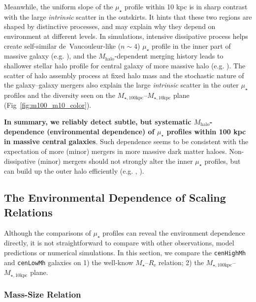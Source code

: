 \documentclass[a4paper,fleqn,usenatbib]{mnras}
\def\rbcg{\texttt{cenHighMh}}
\def\nbcg{\texttt{cenLowMh}}
\def\mstar{{$M_{\star}$}}
\def\mhalo{{$M_{\mathrm{halo}}$}}
\def\minn{{$M_{\star,10\mathrm{kpc}}$}}
\def\mtot{{$M_{\star,100\mathrm{kpc}}$}}
\def\mden{{$\mu_{\star}$}}
\begin{document}
    Meanwhile, the uniform slope of the \mden{} profile within 10 kpc is in sharp 
    contrast with the large \textit{intrinsic} scatter in the outskirts. 
    It hints that these two regions are shaped by distinctive processes, and may 
    explain why they depend on environment at different levels.  
    In simulations, intensive dissipative process helps create 
    self-similar de~Vaucouleur-like ($n{\sim} 4$) \mden{} profile in the inner part 
    of massive galaxy (e.g. \citealt{Hopkins2008}), and the \mhalo{}-dependent
    merging history leads to shallower stellar halo profile for central galaxy 
    of more massive halo (e.g. \citealt{Pillepich2014}). 
    The scatter of halo assembly process at fixed halo mass and the stochastic 
    nature of the galaxy--galaxy mergers also explain the large \textit{intrinsic} 
    scatter in the outer \mden{} profiles and the diversity seen on the 
    \mtot{}--\minn{} plane (Fig~\ref{fig:m100_m10_color}).

    \textbf{In summary, we reliably detect subtle, but systematic \mhalo{}-dependence 
    (environmental dependence) of \mden{} profiles within 100 kpc in massive central 
    galaxies}. 
    Such dependence seems to be consistent with the expectation of more (minor) 
    mergers in more massive dark matter haloes. 
    Non-dissipative (minor) mergers should not strongly alter the inner \mden{} 
    profiles, but can build up the outer halo efficiently
    (e.g. \citealt{Hilz2013}, \citealt{Oogi2013}).
      

\subsection{The Environmental Dependence of Scaling Relations}
    \label{ssec:scaling}
    
    Although the comparisons of \mden{} profiles can reveal the environment dependence 
    directly, it is not straightforward to compare with other observations, model 
    predictions or numerical simulations. 
    In this section, we compare the \rbcg{} and \nbcg{} galaxies on 
    1) the well-know \mstar{}--$R_{\mathrm{e}}$ relation; 
    2) the \mtot{}--\minn{} plane. 
    
\subsubsection{Mass-Size Relation}
    \label{sssec:mass_size}
        
\end{document}

